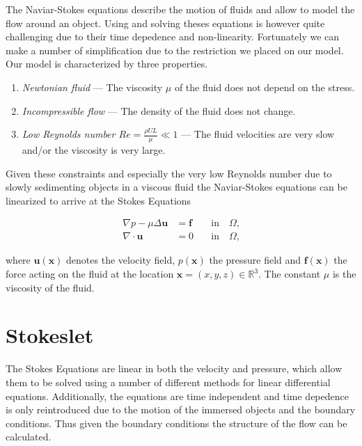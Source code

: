 \documentclass[a4paper,11pt]{kth-mag}
\begin{document}
The Naviar-Stokes equations describe the motion of fluids and allow to model the flow around an object. Using and solving theses equations is however quite challenging due to their time depedence and non-linearity. Fortunately we can make a number of simplification due to the restriction we placed on our model. Our model is characterized by three properties.

\begin{enumerate}
  \item{\textit{Newtonian fluid} — The viscosity $\mu$ of the fluid does not depend on the stress.}
  \item{\textit{Incompressible flow} — The density of the fluid does not change.}
  \item{\textit{Low Reynolds number $Re = \frac{\rho U L}{\mu} \ll 1$} — The fluid velocities are very slow and/or the viscosity is very large.}
\end{enumerate}

Given these constraints and especially the very low Reynolds number due to slowly sedimenting objects in a viscous fluid the Naviar-Stokes equations can be linearized to arrive at the Stokes Equations

\begin{equation}
\label{eq:stokes_equations}
\begin{aligned}
    \nabla p - \mu \Delta \mathbf{u} &= \mathbf{f} \quad &\text{in} \quad \Omega \text{,}\\
    \nabla \cdot \mathbf{u} &= 0 \quad &\text{in} \quad \Omega \text{,}
\end{aligned}
\end{equation}

where $\mathbf{u}(\mathbf{x})$ denotes the velocity field, $p(\mathbf{x})$ the pressure field and $\mathbf{f}(\mathbf{x})$ the force acting on the fluid at the location $\mathbf{x} = (x,y,z) \in \mathbb{R}^3$.
The constant $\mu$ is the viscosity of the fluid.

\section{Stokeslet}

The Stokes Equations are linear in both the velocity and pressure, which allow them to be solved using a number of different methods for linear differential equations. Additionally, the equations are time independent and time depedence is only reintroduced due to the motion of the immersed objects and the boundary conditions. Thus given the boundary conditions the structure of the flow can be calculated.
\end{document}
